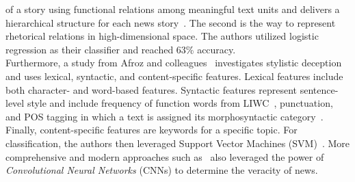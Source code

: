\begin{description}
\begin{itemize}
of a story using functional relations among meaningful text units and delivers a hierarchical structure for each news story~\parencite{RST_William}. The second is the way to represent rhetorical relations in high-dimensional space. The authors utilized logistic regression as their classifier and reached 63\% accuracy.\\Furthermore, a study from Afroz and colleagues~\parencite{DetectingHoaxesFraudsAndDeception_Afroz} investigates stylistic deception and uses lexical, syntactic, and content-specific features. Lexical features include both character- and word-based features. Syntactic features represent sentence-level style and include frequency of function words from LIWC~\parencite{LIWC2007_Pennebaker}, punctuation, and POS tagging in which a text is assigned its morphosyntactic category~\parencite{POS_Daelemans}. Finally, content-specific features are keywords for a specific topic. For classification, the authors then leveraged Support Vector Machines (SVM)~\parencite{SVM_Hearst}. More comprehensive and modern approaches such as~\parencite{LiarLiarPantsOnFire_Wang} also leveraged the power of \emph{Convolutional Neural Networks} (CNNs) to determine the veracity of news.

\end{itemize}
\end{description}

